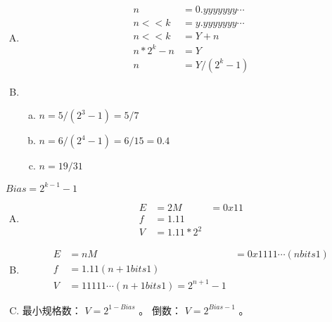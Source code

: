 {    %
    \begin{practicec}
        \begin{enumerate}[A.]
            \item
            {
                \begin{align}
                    n &= 0.yyyyyyy\cdots \\
                    n << k &= y.yyyyyyy\cdots \\
                    n << k &= Y + n \\
                    n * 2^k - n &= Y \\
                    n &= Y / (2^k - 1)
                \end{align}
            }
            \item
            {
                \begin{enumerate}[(a)]
                    \item $n = 5 / (2^3 - 1) = 5 / 7$
                    \item $n = 6 / (2^4 - 1) = 6 / 15 = 0.4$
                    \item $n = 19 / 31$
                \end{enumerate}
            }
        \end{enumerate}
    \end{practicec}

    \begin{practicec}

    \end{practicec}

    \begin{practicec}
        $Bias = 2^{k - 1} - 1$
        \begin{enumerate}[A.]
            \item
            {
                \begin{align*}
                    E &= 2
                    M &= 0x11 \\
                    f &= 1.11 \\
                    V &= 1.11 * 2^2
                \end{align*}
            }
            \item
            {
                \begin{align*}
                    E &= n
                    M &= 0x1111\cdots (n bits 1) \\
                    f &= 1.11 (n + 1 bits 1) \\
                    V &= 11111\cdots (n + 1 bits 1) = 2^{n + 1} - 1
                \end{align*}
            }
            \item
            {
                最小规格数： $V = 2^{1 - Bias}$ 。
                倒数： $V = 2^{Bias - 1}$ 。

}
\end{enumerate}
\end{practicec}}
